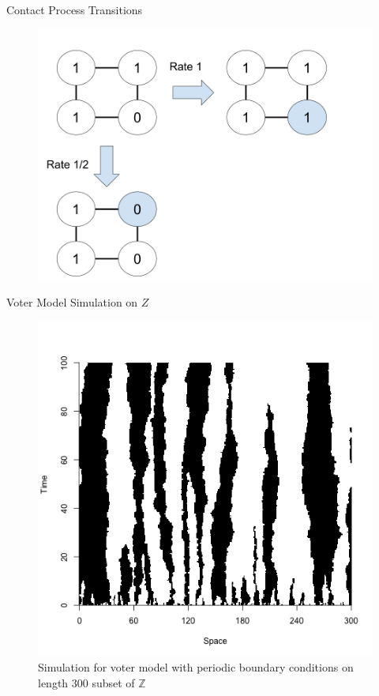 \documentclass{beamer}
\theoremstyle{definition}
\newcommand{\Z}{\mathbb{Z}}
\begin{document}
\begin{frame}{Contact Process Transitions}
    \begin{figure}[H]
  \centering
    \includegraphics[width=.80\textwidth]{figures/voter_model_config_example.png}
\end{figure}
\end{frame}

\begin{frame}{Voter Model Simulation on $Z$}
\begin{figure}[H]
  \centering
    \includegraphics[width=.6\textwidth]{figures/voter_simulation_1d_300.png}
   \caption{Simulation for voter model with periodic boundary conditions on length 300 subset of $\Z$}
  \label{fig:voter_sim_1d_torus.png}
\end{figure}
\end{frame}
\end{document}
